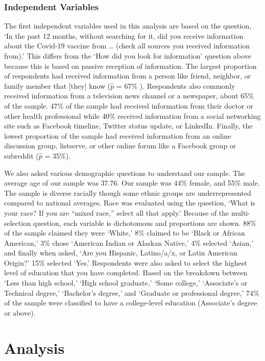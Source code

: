 \hypertarget{independent-variables}{%
\subsubsection{Independent Variables}\label{independent-variables}}

The first independent variables used in this analysis are based on the question,
`In the past 12 months, without searching for it, did you receive information
about the Covid-19 vaccine from \ldots{} (check all sources you received information
from).' This differs from the `How did you look for information' question above
because this is based on passive reception of information. The largest proportion
of respondents had received information from a person like friend, neighbor, or
family member that {[}they{]} know (\(\widehat{p}\) = 67\%
). Respondents also commonly received information from a television news channel
or a newspaper, about 65\% of the sample.
47\% of the sample had received information from
their doctor or other health professional while 40\%
received information from a social networking site such as Facebook timeline,
Twitter status update, or LinkedIn. Finally, the lowest proportion of the sample
had received information from an online discussion group, listserve, or other
online forum like a Facebook group or subreddit
(\(\widehat{p}\) = 35\%).

We also asked various demographic questions to understand our sample. The
average age of our sample was 37.76.
Our sample was 44\%
female, and 55\%
male. The sample is diverse racially though some ethnic groups are underrepresented compared to national averages. Race was evaluated using the
question, `What is your race? If you are ``mixed race,'' select all that apply.'
Because of the multi-selection question, each variable is dichotomous and
proportions are shown. 88\% of the sample claimed
they were `White,' 8\% claimed to be `Black or
African American,' 3\% chose `American Indian or
Alaskan Native,' 4\% selected `Asian,' and finally
when asked, `Are you Hispanic, Latino/a/x, or Latin American Origin?'
15\% selected `Yes.' Respondents were also asked to
select the highest level of education that you have completed. Based on the
breakdown between `Less than high school,' `High school graduate,' `Some college,'
`Associate's or Technical degree,' `Bachelor's degree,' and `Graduate or
professional degree,' 74\% of the sample were classified
to have a college-level education (Associate's degree or above).

\hypertarget{analysis}{%
\section{Analysis}\label{analysis}}


